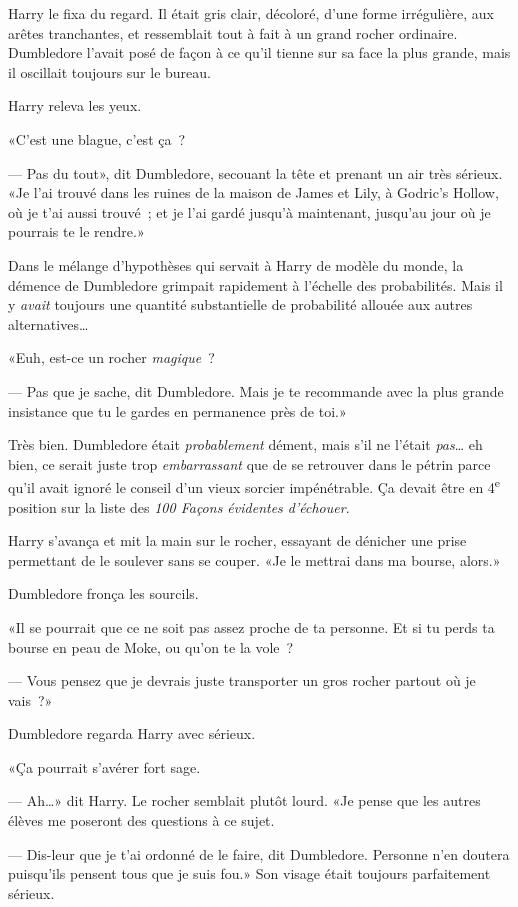 Harry le fixa du regard. Il était gris clair, décoloré, d'une forme irrégulière, aux arêtes tranchantes, et ressemblait tout à fait à un grand rocher ordinaire. Dumbledore l'avait posé de façon à ce qu'il tienne sur sa face la plus grande, mais il oscillait toujours sur le bureau.

Harry releva les yeux.

«C'est une blague, c'est ça~?

--- Pas du tout», dit Dumbledore, secouant la tête et prenant un air très sérieux. «Je l'ai trouvé dans les ruines de la maison de James et Lily, à Godric's Hollow, où je t'ai aussi trouvé~; et je l'ai gardé jusqu'à maintenant, jusqu'au jour où je pourrais te le rendre.»

Dans le mélange d'hypothèses qui servait à Harry de modèle du monde, la démence de Dumbledore grimpait rapidement à l'échelle des probabilités. Mais il y \emph{avait} toujours une quantité substantielle de probabilité allouée aux autres alternatives…

«Euh, est-ce un rocher \emph{magique}~?

--- Pas que je sache, dit Dumbledore. Mais je te recommande avec la plus grande insistance que tu le gardes en permanence près de toi.»

Très bien. Dumbledore était \emph{probablement} dément, mais s'il ne l'était \emph{pas}… eh bien, ce serait juste trop \emph{embarrassant} que de se retrouver dans le pétrin parce qu'il avait ignoré le conseil d'un vieux sorcier impénétrable. Ça devait être en 4\textsuperscript{e} position sur la liste des \emph{100 Façons évidentes d'échouer}.

Harry s'avança et mit la main sur le rocher, essayant de dénicher une prise permettant de le soulever sans se couper. «Je le mettrai dans ma bourse, alors.»

Dumbledore fronça les sourcils.

«Il se pourrait que ce ne soit pas assez proche de ta personne. Et si tu perds ta bourse en peau de Moke, ou qu'on te la vole~?

--- Vous pensez que je devrais juste transporter un gros rocher partout où je vais~?»

Dumbledore regarda Harry avec sérieux.

«Ça pourrait s'avérer fort sage.

--- Ah…» dit Harry. Le rocher semblait plutôt lourd. «Je pense que les autres élèves me poseront des questions à ce sujet.

--- Dis-leur que je t'ai ordonné de le faire, dit Dumbledore. Personne n'en doutera puisqu'ils pensent tous que je suis fou.» Son visage était toujours parfaitement sérieux.

